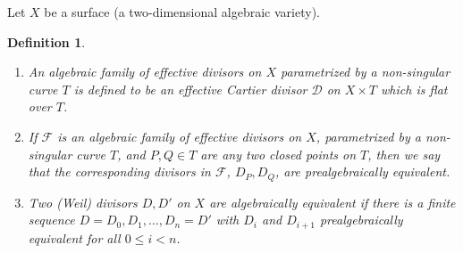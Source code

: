 \documentclass[12pt]{article}
\newtheorem{defn}{Definition}
\theoremstyle{definition}
\begin{document}
Let $X$ be a surface (a two-dimensional algebraic variety).

\begin{defn}
\begin{enumerate}
\item An algebraic family of effective divisors on $X$ parametrized by a non-singular curve $T$ is defined to be an effective Cartier divisor $\mathcal{D}$ on $X\times T$ which is flat over $T$.
\item If $\mathcal{F}$ is an algebraic family of effective divisors on $X$, parametrized by a non-singular curve $T$, and $P,Q\in T$ are any two closed points on $T$, then we say that the corresponding divisors in $\mathcal{F}$, $D_P,D_Q$, are prealgebraically equivalent.
\item Two (Weil) divisors $D,D'$ on $X$ are algebraically equivalent if there is a finite sequence $D=D_0, D_1, \ldots, D_n=D'$ with $D_i$ and $D_{i+1}$ prealgebraically equivalent for all $0\leq i < n$. 
\end{enumerate}
\end{defn}
\end{document}
